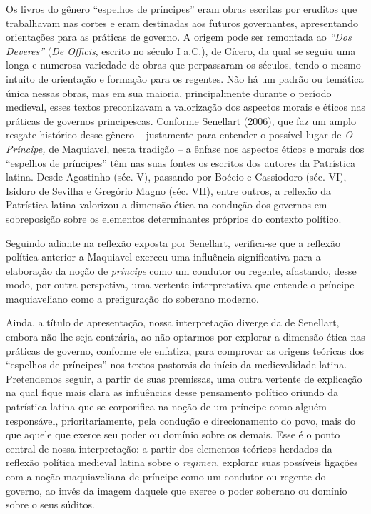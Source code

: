 Os livros do gênero ``espelhos de príncipes'' eram obras escritas por
eruditos que trabalhavam nas cortes e eram destinadas aos futuros
governantes, apresentando orientações para as práticas de governo. A
origem pode ser remontada ao \emph{``Dos Deveres''} (\emph{De Officis},
escrito no século I a.C.), de Cícero, da qual se seguiu uma longa e
numerosa variedade de obras que perpassaram os séculos, tendo o mesmo
intuito de orientação e formação para os regentes. Não há um padrão ou
temática única nessas obras, mas em sua maioria, principalmente durante
o período medieval, esses textos preconizavam a valorização dos aspectos
morais e éticos nas práticas de governos principescas. Conforme
Senellart (2006), que faz um amplo resgate histórico desse gênero --
justamente para entender o possível lugar de \emph{O Príncipe,} de
Maquiavel, nesta tradição -- a ênfase nos aspectos éticos e morais dos
``espelhos de príncipes'' têm nas suas fontes os escritos dos autores da
Patrística latina. Desde Agostinho (séc. V), passando por Boécio e
Cassiodoro (séc. VI), Isidoro de Sevilha e Gregório Magno (séc. VII),
entre outros, a reflexão da Patrística latina valorizou a dimensão ética
na condução dos governos em sobreposição sobre os elementos
determinantes próprios do contexto político.

Seguindo adiante na reflexão exposta por Senellart, verifica-se que a
reflexão política anterior a Maquiavel exerceu uma influência
significativa para a elaboração da noção de \emph{príncipe} como um
condutor ou regente, afastando, desse modo, por outra perspctiva, uma
vertente interpretativa que entende o príncipe maquiaveliano como a
prefiguração do soberano moderno.

Ainda, a título de apresentação, nossa interpretação diverge da de
Senellart, embora não lhe seja contrária, ao não optarmos por explorar a
dimensão ética nas práticas de governo, conforme ele enfatiza, para
comprovar as origens teóricas dos ``espelhos de príncipes'' nos textos
pastorais do início da medievalidade latina. Pretendemos seguir, a
partir de suas premissas, uma outra vertente de explicação na qual fique
mais clara as influências desse pensamento político oriundo da
patrística latina que se corporifica na noção de um príncipe como alguém
responsável, prioritariamente, pela condução e direcionamento do povo,
mais do que aquele que exerce seu poder ou domínio sobre os demais. Esse
é o ponto central de nossa interpretação: a partir dos elementos
teóricos herdados da reflexão política medieval latina sobre o
\emph{regimen}, explorar suas possíveis ligações com a noção
maquiaveliana de príncipe como um condutor ou regente do governo, ao
invés da imagem daquele que exerce o poder soberano ou domínio sobre o
seus súditos.

